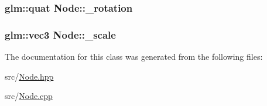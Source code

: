 \subsubsection[{\texorpdfstring{\+\_\+rotation}{_rotation}}]{\setlength{\rightskip}{0pt plus 5cm}glm\+::quat Node\+::\+\_\+rotation\hspace{0.3cm}{\ttfamily [private]}}\hypertarget{classNode_a8ca75f9f976a292c9f56c881162ee606}{}\label{classNode_a8ca75f9f976a292c9f56c881162ee606}
\subsubsection[{\texorpdfstring{\+\_\+scale}{_scale}}]{\setlength{\rightskip}{0pt plus 5cm}glm\+::vec3 Node\+::\+\_\+scale\hspace{0.3cm}{\ttfamily [private]}}\hypertarget{classNode_a87179723de57ea9bdcf179ee5164deb3}{}\label{classNode_a87179723de57ea9bdcf179ee5164deb3}


The documentation for this class was generated from the following files\+:\begin{DoxyCompactItemize}
\item 
src/\hyperlink{Node_8hpp}{Node.\+hpp}\item 
src/\hyperlink{Node_8cpp}{Node.\+cpp}\end{DoxyCompactItemize}

